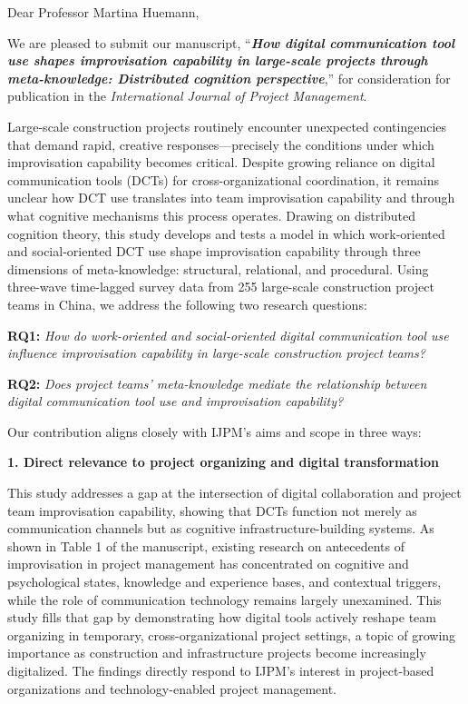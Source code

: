 \documentclass[12pt]{article}
\begin{document}
Dear Professor Martina Huemann,

We are pleased to submit our manuscript, ``\textbf{\textit{How digital communication tool use shapes improvisation capability in large-scale projects through meta-knowledge: Distributed cognition perspective}},'' for consideration for publication in the \textit{International Journal of Project Management}.

Large-scale construction projects routinely encounter unexpected contingencies that demand rapid, creative responses---precisely the conditions under which improvisation capability becomes critical. Despite growing reliance on digital communication tools (DCTs) for cross-organizational coordination, it remains unclear how DCT use translates into team improvisation capability and through what cognitive mechanisms this process operates. Drawing on distributed cognition theory, this study develops and tests a model in which work-oriented and social-oriented DCT use shape improvisation capability through three dimensions of meta-knowledge: structural, relational, and procedural. Using three-wave time-lagged survey data from 255 large-scale construction project teams in China, we address the following two research questions:

\textbf{RQ1:} \textit{How do work-oriented and social-oriented digital communication tool use influence improvisation capability in large-scale construction project teams?}

\textbf{RQ2:} \textit{Does project teams' meta-knowledge mediate the relationship between digital communication tool use and improvisation capability?}

Our contribution aligns closely with IJPM's aims and scope in three ways:

\textbf{1. Direct relevance to project organizing and digital transformation}

This study addresses a gap at the intersection of digital collaboration and project team improvisation capability, showing that DCTs function not merely as communication channels but as cognitive infrastructure-building systems. As shown in Table 1 of the manuscript, existing research on antecedents of improvisation in project management has concentrated on cognitive and psychological states, knowledge and experience bases, and contextual triggers, while the role of communication technology remains largely unexamined. This study fills that gap by demonstrating how digital tools actively reshape team organizing in temporary, cross-organizational project settings, a topic of growing importance as construction and infrastructure projects become increasingly digitalized. The findings directly respond to IJPM's interest in project-based organizations and technology-enabled project management.
\end{document}
